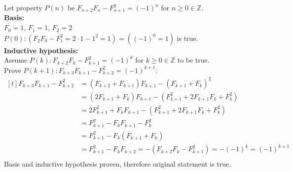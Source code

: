 \documentclass[letterpaper,fleqn,leqno]{article}
\begin{document}
\begin{enumerate}[(a)]
{			Let property $P(n)$ be $F_{n+2}F_n-F^2_{n+1}=(-1)^n$ for $n\geq0\in\mathbb{Z}$. \\
			\textbf{Basis:} \\
			$F_0=1$, $F_1=1$, $F_2=2$ \\
			$P(0): (F_2F_0-F^2_1=2\cdot1-1^2=1)=((-1)^0=1)$ is true. \\
			\textbf{Inductive hypothesis:} \\
			Assume $P(k): F_{k+2}F_k-F^2_{k+1}=(-1)^k$ for $k\geq0\in\mathbb{Z}$ to be true. \\
			Prove $P(k+1): F_{k+3}F_{k+1}-F^2_{k+2}=(-1)^{k+1}$: \\
			$\begin{aligned}[t]
				F_{k+3}F_{k+1}-F^2_{k+2} &= (F_{k+2}+F_{k+1})F_{k+1}-(F_{k+1}+F_{k})^2 \\
				&= (2F_{k+1}+F_k)F_{k+1}-(F^2_{k+1}+2F_{k+1}F_k+F^2_{k}) \\
				&= 2F^2_{k+1}+F_kF_{k+1}-(F^2_{k+1}+2F_{k+1}F_k+F^2_{k}) \\
				&= F^2_{k+1}-F_kF_{k+1}-F^2_k \\
				&= F^2_{k+1}-F_k(F_{k+1}+F_k) \\
				&= F^2_{k+1}-F_kF_{k+2}=-(F_{k+2}F_k-F^2_{k+1})=-(-1)^k=(-1)^{k+1}\\
			\end{aligned}$ \\
			Basis and inductive hypothesis proven, therefore original statement is true. \\
		}
\end{enumerate}
\end{document}
